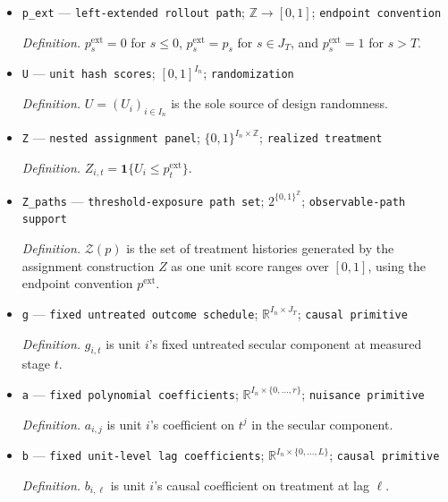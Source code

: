 \documentclass{article}
\begin{document}
\begin{itemize}
  \par\smallskip\noindent\emph{Definition.} \(p=(p_0,\ldots,p_T)\) is the precommitted threshold schedule.
  \item \texttt{p\_\allowbreak{}ext} --- \texttt{left-\allowbreak{}extended rollout path}; \(\mathbb Z\to[0,1]\); \texttt{endpoint convention}
  \par\smallskip\noindent\emph{Definition.} \(p^{\mathrm{ext}}_s=0\) for \(s\le 0\), \(p^{\mathrm{ext}}_s=p_s\) for \(s\in J_T\), and \(p^{\mathrm{ext}}_s=1\) for \(s>T\).
  \item \texttt{U} --- \texttt{unit hash scores}; \([0,1]^{I_n}\); \texttt{randomization}
  \par\smallskip\noindent\emph{Definition.} \(U=(U_i)_{i\in I_n}\) is the sole source of design randomness.
  \item \texttt{Z} --- \texttt{nested assignment panel}; \(\{0,1\}^{I_n\times\mathbb Z}\); \texttt{realized treatment}
  \par\smallskip\noindent\emph{Definition.} \(Z_{i,t}=\mathbf 1\{U_i\le p^{\mathrm{ext}}_t\}\).
  \item \texttt{Z\_\allowbreak{}paths} --- \texttt{threshold-\allowbreak{}exposure path set}; \(2^{\{0,1\}^{\mathbb Z}}\); \texttt{observable-\allowbreak{}path support}
  \par\smallskip\noindent\emph{Definition.} \(\mathcal Z(p)\) is the set of treatment histories generated by the assignment construction \(Z\) as one unit score ranges over \([0,1]\), using the endpoint convention \(p^{\mathrm{ext}}\).
  \item \texttt{g} --- \texttt{fixed untreated outcome schedule}; \(\mathbb R^{I_n\times J_T}\); \texttt{causal primitive}
  \par\smallskip\noindent\emph{Definition.} \(g_{i,t}\) is unit \(i\)'s fixed untreated secular component at measured stage \(t\).
  \item \texttt{a} --- \texttt{fixed polynomial coefficients}; \(\mathbb R^{I_n\times\{0,\ldots,r\}}\); \texttt{nuisance primitive}
  \par\smallskip\noindent\emph{Definition.} \(a_{i,j}\) is unit \(i\)'s coefficient on \(t^j\) in the secular component.
  \item \texttt{b} --- \texttt{fixed unit-\allowbreak{}level lag coefficients}; \(\mathbb R^{I_n\times\{0,\ldots,L\}}\); \texttt{causal primitive}
  \par\smallskip\noindent\emph{Definition.} \(b_{i,\ell}\) is unit \(i\)'s causal coefficient on treatment at lag \(\ell\).

\end{itemize}
\end{document}
